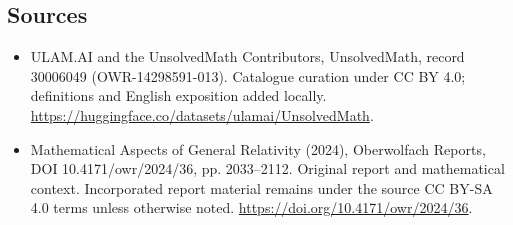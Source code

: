 \documentclass[11pt]{article}
\begin{document}
\subsection{Sources}
\begin{itemize}
\item[\hypertarget{source:30006049:1}{S1}] ULAM.AI and the UnsolvedMath Contributors, UnsolvedMath, record 30006049 (OWR-14298591-013). Catalogue curation under CC BY 4.0; definitions and English exposition added locally.
\url{https://huggingface.co/datasets/ulamai/UnsolvedMath}.
\item[\hypertarget{source:30006049:2}{S2}] Mathematical Aspects of General Relativity (2024), Oberwolfach Reports, DOI 10.4171/owr/2024/36, pp. 2033--2112. Original report and mathematical context. Incorporated report material remains under the source CC BY-SA 4.0 terms unless otherwise noted.
\url{https://doi.org/10.4171/owr/2024/36}.
\end{itemize}
\label{end:30006049}
\end{document}
